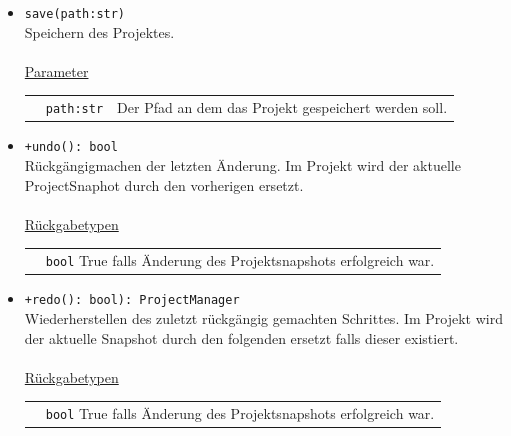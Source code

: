 \documentclass{article}
\begin{document}
\begin{itemize}
\begin{itemize}
\item \texttt{save(path:str)}\\ Speichern des Projektes.\\\\
\underline{{Parameter}}\\
\begin{tabular}{lll}
 & \texttt{path:str} & Der Pfad an dem das Projekt gespeichert werden soll. \\
\end{tabular}
\item \texttt{+undo(): bool}\\ Rückgängigmachen der letzten Änderung. Im Projekt wird der aktuelle ProjectSnaphot durch den vorherigen ersetzt.\\\\
\underline{{Rückgabetypen}}\\
\begin{tabular}{lp{10.7cm}}
 & \texttt{bool}  True falls Änderung des Projektsnapshots erfolgreich war.\\
\end{tabular}
\item \texttt{+redo(): bool): ProjectManager}\\ Wiederherstellen des zuletzt rückgängig gemachten Schrittes. Im Projekt wird der aktuelle Snapshot durch den folgenden ersetzt falls dieser existiert.\\\\
\underline{{Rückgabetypen}}\\
\begin{tabular}{lp{10.7cm}}
 & \texttt{bool}  True falls Änderung des Projektsnapshots erfolgreich war.\\
\end{tabular}
\end{itemize}



\end{itemize}
\end{document}
